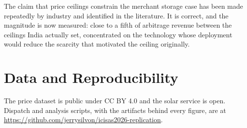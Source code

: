 \documentclass[conference,a4paper]{IEEEtran}
\begin{document}
The claim that price ceilings constrain the merchant storage case has been made
repeatedly by industry and identified in the literature. It is correct, and the
magnitude is now measured: close to a fifth of arbitrage revenue between the
ceilings India actually set, concentrated on the technology whose deployment
would reduce the scarcity that motivated the ceiling originally.

\section*{Data and Reproducibility}

The price dataset \cite{veeramsetty2024} is public under CC BY 4.0 and the solar
service \cite{pvgis} is open. Dispatch and analysis scripts, with the artifacts
behind every figure, are at
\url{https://github.com/jerrysilvon/icisas2026-replication}.
\end{document}
